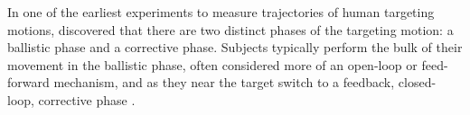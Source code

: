 %
%
%
In one of the earliest experiments to measure trajectories of human targeting motions, \citet{woodworth_accuracy_1899} discovered that there are two distinct phases of the targeting motion: a ballistic phase and a corrective phase.
Subjects typically perform the bulk of their movement in the ballistic phase, often considered more of an open-loop or feed-forward mechanism, and as they near the target switch to a feedback, closed-loop, corrective phase \citep{elliott_control_1999}.

